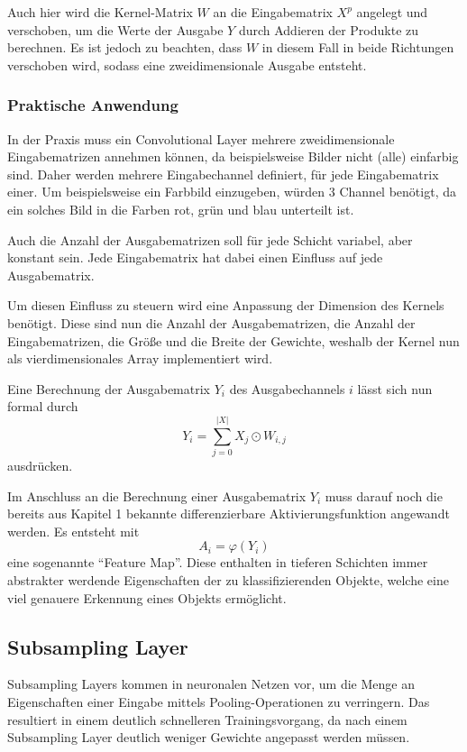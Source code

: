 \documentclass[12pt,a4]{article}
\begin{document}
Auch hier wird die Kernel-Matrix $W$ an die Eingabematrix $X^p$ angelegt und verschoben, um die Werte der Ausgabe $Y$ durch Addieren der Produkte zu berechnen. Es ist jedoch zu beachten, dass $W$ in diesem Fall in beide Richtungen verschoben wird, sodass eine zweidimensionale Ausgabe entsteht.

\subsubsection{Praktische Anwendung}
In der Praxis muss ein Convolutional Layer mehrere zweidimensionale Eingabematrizen annehmen können, da beispielsweise Bilder nicht (alle) einfarbig sind. Daher werden mehrere Eingabechannel definiert, für jede Eingabematrix einer. Um beispielsweise ein Farbbild einzugeben, würden 3 Channel benötigt, da ein solches Bild in die Farben rot, grün und blau unterteilt ist.

Auch die Anzahl der Ausgabematrizen soll für jede Schicht variabel, aber konstant sein. Jede Eingabematrix hat dabei einen Einfluss auf jede Ausgabematrix.

Um diesen Einfluss zu steuern wird eine Anpassung der Dimension des Kernels benötigt. Diese sind nun die Anzahl der Ausgabematrizen, die Anzahl der Eingabematrizen, die Größe und die Breite der Gewichte, weshalb der Kernel nun als vierdimensionales Array implementiert wird.

Eine Berechnung der Ausgabematrix $Y_i$ des Ausgabechannels $i$ lässt sich nun formal durch
\begin{equation}
Y_i = \sum\limits_{j=0}^{|X|} X_j \odot W_{i, j}
\end{equation}
ausdrücken.

Im Anschluss an die Berechnung einer Ausgabematrix $Y_i$ muss darauf noch die bereits aus Kapitel 1 bekannte differenzierbare Aktivierungsfunktion angewandt werden. Es entsteht mit 
\[
A_i = \varphi (Y_i)
\]
eine sogenannte \enquote{Feature Map}. Diese enthalten in tieferen Schichten immer abstrakter werdende Eigenschaften der zu klassifizierenden Objekte, welche eine viel genauere Erkennung eines Objekts ermöglicht.

\subsection{Subsampling Layer}
Subsampling Layers kommen in neuronalen Netzen vor, um die Menge an Eigenschaften einer Eingabe mittels Pooling-Operationen zu verringern. Das resultiert in einem deutlich schnelleren Trainingsvorgang, da nach einem Subsampling Layer deutlich weniger Gewichte angepasst werden müssen.
\end{document}
